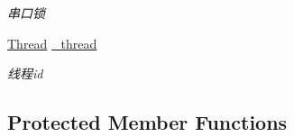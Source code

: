 \begin{DoxyCompactItemize}
\begin{DoxyCompactList}\small\item\em 串口锁 \end{DoxyCompactList}\item 
\hyperlink{class_thread}{Thread} \hyperlink{classydlidar_1_1_y_dlidar_driver_a9fbd1b3471c1aa4959d74524b9a92410}{\+\_\+thread}\hypertarget{classydlidar_1_1_y_dlidar_driver_a9fbd1b3471c1aa4959d74524b9a92410}{}\label{classydlidar_1_1_y_dlidar_driver_a9fbd1b3471c1aa4959d74524b9a92410}

\begin{DoxyCompactList}\small\item\em 线程id \end{DoxyCompactList}\end{DoxyCompactItemize}
\subsection*{Protected Member Functions}
